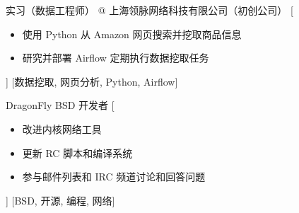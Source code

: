 \documentclass[zh]{resume}
\begin{document}
\begin{experiences}
    {实习（数据工程师） @ 上海领脉网络科技有限公司（初创公司）}%
    [\begin{itemize}
      \item 使用 Python 从 Amazon 网页搜索并挖取商品信息
      \item 研究并部署 Airflow 定期执行数据挖取任务
    \end{itemize}]%
    [数据挖取, 网页分析, Python, Airflow]


  \separator{0.5em}
    {DragonFly BSD 开发者}%
    [\begin{itemize}
      \item 改进内核网络工具
      \item 更新 RC 脚本和编译系统
      \item 参与邮件列表和 IRC 频道讨论和回答问题
    \end{itemize}]%
    [BSD, 开源, 编程, 网络]






\end{experiences}
\end{document}
